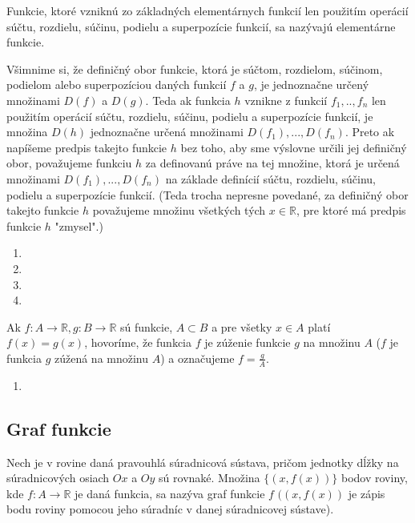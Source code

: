 Funkcie, ktoré vzniknú zo základných elementárnych funkcií len použitím operácií súčtu, rozdielu, súčinu, podielu a superpozície funkcií, sa nazývajú elementárne funkcie.

Všimnime si, že definičný obor funkcie, ktorá je súčtom, rozdielom, súčinom, podielom alebo superpozíciou daných funkcií $f$ a $g$, je jednoznačne určený množinami $D(f)$ a $D(g)$. Teda ak funkcia $h$ vznikne z funkcií $f_1,..,f_n$ len použitím operácií súčtu, rozdielu, súčinu, podielu a superpozície funkcií, je množina $D(h)$ jednoznačne určená množinami $D(f_1),...,D(f_n)$. Preto ak napíšeme predpis takejto funkcie $h$ bez toho, aby sme výslovne určili jej definičný obor, považujeme funkciu $h$ za definovanú práve na tej množine, ktorá je určená množinami $D(f_1),...,D(f_n)$ na základe definícií súčtu, rozdielu, súčinu, podielu a superpozície funkcií. (Teda trocha nepresne povedané, za definičný obor takejto funkcie $h$ považujeme množinu všetkých tých $x\in\mathbb{R}$, pre ktoré má predpis funkcie $h$ "zmysel".)

\begin{enumerate}[resume]
  \item {}
  \item {}
  \item {}
  \item {}
\end{enumerate}

Ak $f:A\rightarrow\mathbb{R},g:B\rightarrow\mathbb{R}$ sú funkcie, $A\subset B$ a pre všetky $x\in A$ platí $f(x)=g(x)$, hovoríme, že funkcia $f$ je zúženie funkcie $g$ na množinu $A$ ($f$ je funkcia $g$ zúžená na množinu $A$) a označujeme $f=\frac{g}{A}$.

\begin{enumerate}[resume]
  \item {}
\end{enumerate}

\subsection{Graf funkcie}
Nech je v rovine daná pravouhlá súradnicová sústava, pričom jednotky dĺžky na súradnicových osiach $Ox$ a $Oy$ sú rovnaké. Množina $\{(x,f(x))\}$ bodov roviny, kde $f:A\rightarrow\mathbb{R}$ je daná funkcia, sa nazýva graf funkcie $f$ $((x,f(x))$ je zápis bodu roviny pomocou jeho súradníc v danej súradnicovej sústave).

